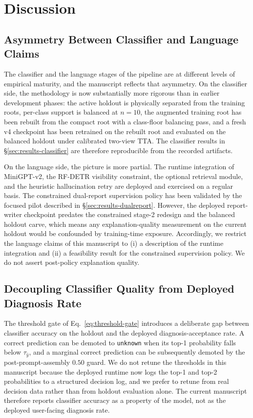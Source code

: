 \section{Discussion}

\subsection{Asymmetry Between Classifier and Language Claims}

The classifier and the language stages of the pipeline are at different
levels of empirical maturity, and the manuscript reflects that
asymmetry. On the classifier side, the methodology is now substantially
more rigorous than in earlier development phases: the active holdout is
physically separated from the training roots, per-class support is
balanced at $n=10$, the augmented training root has been rebuilt from
the compact root with a class-floor balancing pass, and a fresh v4
checkpoint has been retrained on the rebuilt root and evaluated on the
balanced holdout under calibrated two-view TTA. The classifier results
in \S\ref{sec:results-classifier} are therefore reproducible from the
recorded artifacts.

On the language side, the picture is more partial. The runtime
integration of MiniGPT-v2, the RF-DETR visibility constraint, the
optional retrieval module, and the heuristic hallucination retry are
deployed and exercised on a regular basis. The constrained dual-report
supervision policy has been validated by the focused pilot described in
\S\ref{sec:results-dualreport}. However, the deployed report-writer
checkpoint predates the constrained stage-2 redesign and the balanced
holdout carve, which means any explanation-quality measurement on the
current holdout would be confounded by training-time exposure.
Accordingly, we restrict the language claims of this manuscript to (i) a
description of the runtime integration and (ii) a feasibility result for
the constrained supervision policy. We do not assert post-policy
explanation quality.

\subsection{Decoupling Classifier Quality from Deployed Diagnosis Rate}

The threshold gate of Eq.~\ref{eq:threshold-gate} introduces a
deliberate gap between classifier accuracy on the holdout and the
deployed diagnosis-acceptance rate. A correct prediction can be demoted
to \texttt{unknown} when its top-1 probability falls below
$\tau_{\hat{y}}$, and a marginal correct prediction can be subsequently
demoted by the post-prompt-assembly $0.50$ guard. We do not retune the
thresholds in this manuscript because the deployed runtime now logs the
top-1 and top-2 probabilities to a structured decision log, and we
prefer to retune from real decision data rather than from holdout
evaluation alone. The current manuscript therefore reports classifier
accuracy as a property of the model, not as the deployed user-facing
diagnosis rate.

